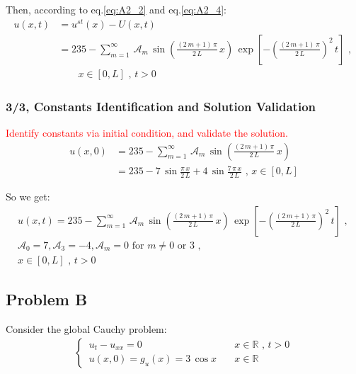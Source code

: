 \documentclass[../main.tex]{subfiles}
\begin{document}
Then, according to eq.\ref{eq:A2_2} and eq.\ref{eq:A2_4}:
\begin{align}
    u(x,t) &= u^{st}(x) - U(x,t) \\
           &= 235 - \sum_{m=1}^{\infty} \, \mathcal{A}_m \,  \sin{\left(\frac{(2 \, m + 1) \, \pi}{2 \, L} \, x\right)} \, \exp{\left[- \left(\frac{(2 \, m + 1) \, \pi}{2 \, L}\right)^2 \, t \right]} \text{ ,  } \\
    &\qquad x \in [0,L] \text{ ,  } t > 0
\end{align}

\subsubsection{3/3, Constants Identification and Solution Validation}

\textcolor{red}{Identify constants via initial condition, and validate the solution.}
\begin{align}
    u(x,0) &= 235 - \sum_{m=1}^{\infty} \, \mathcal{A}_m \,  \sin{\left(\frac{(2 \, m + 1) \, \pi}{2 \, L} \, x\right)} \\ 
    &= 235 - 7 \, \sin{\frac{\pi \, x}{2 \, L}} + 4 \, \sin{\frac{7 \, \pi \, x}{2 \, L}} \text{ ,  } x \in [0,L]
\end{align}

So we get:
\begin{align}
    u(x,t) = 235 - \sum_{m=1}^{\infty} \, \mathcal{A}_m \,  \sin{\left(\frac{(2 \, m + 1) \, \pi}{2 \, L} \, x\right)} \, \exp{\left[- \left(\frac{(2 \, m + 1) \, \pi}{2 \, L}\right)^2 \, t \right]} \text{ ,  } \\
    \mathcal{A}_0 = 7, \mathcal{A}_3 = - 4, \mathcal{A}_m = 0 \text{ for  } m \neq 0 \text{ or  } 3 \text{ ,  } \nonumber \\
    x \in [0,L] \text{ ,  } t > 0 \nonumber
\end{align}

\subsection{Problem B}

Consider the global Cauchy problem:
\begin{align}
    \begin{cases}
        \, u_t - u_{xx} = 0 \quad & x \in \mathbb{R} \text{ ,  } t > 0 \\
        \, u(x,0) = g_u(x) = 3 \, \cos{x} \quad & x \in \mathbb{R}
    \end{cases}
\end{align}
\end{document}
